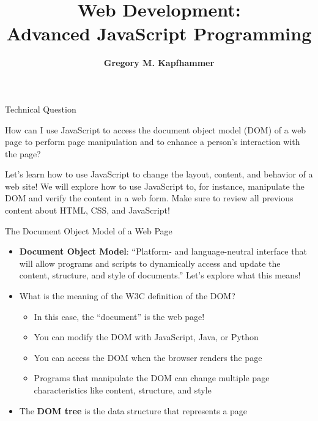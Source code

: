 \documentclass[14pt,aspectratio=169]{beamer}
\title{Web Development: \\ Advanced JavaScript Programming}
\author{{\bf Gregory M. Kapfhammer}}
\institute[shortinst]{{\bf Department of Computer Science, Allegheny College}}
\begin{document}
{
  \begin{frame}
    \titlepage
  \end{frame}
}

%
\begin{frame}{Technical Question}
  \hspace*{.15in}
  \begin{minipage}{5in}
    \vspace*{.5in}
    \begin{center}
      {\large How can I use JavaScript to access the document object model
        (DOM) of a web page to perform page manipulation and to enhance a
      person's interaction with the page?}
    \end{center}
  \end{minipage}
  \vspace{1ex}
  \begin{center}
    \small Let's learn how to use JavaScript to change the layout, content, and
    behavior of a web site! We will explore how to use JavaScript to, for
    instance, manipulate the DOM and verify the content in a web form. Make
    sure to review all previous content about HTML, CSS, and JavaScript! \\
  \end{center}
\end{frame}

%
\begin{frame}{The Document Object Model of a Web Page}
  \begin{itemize}
    \item {\bf Document Object Model}: ``Platform- and language-neutral interface
      that will allow programs and scripts to dynamically access and update the
      content, structure, and style of documents.'' Let's explore what this
      means!
      \vspace*{-.15in}
    \item What is the meaning of the W3C definition of the DOM?
      \begin{itemize}
        \item In this case, the ``document'' is the web page!
        \item You can modify the DOM with JavaScript, Java, or Python
        \item You can access the DOM when the browser renders the page
        \item Programs that manipulate the DOM can change multiple page
          characteristics like content, structure, and style
      \end{itemize}
      \vspace*{-.25in}
    \item The {\bf DOM tree} is the data structure that represents a page
  \end{itemize}
\end{frame}
\end{document}
